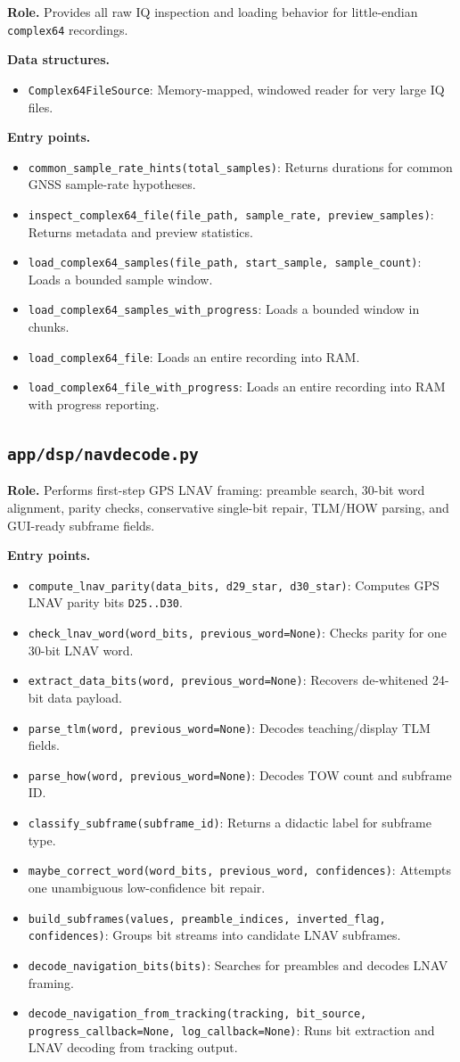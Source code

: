 \documentclass[11pt,a4paper]{article}
\newcommand{\codepath}[1]{\nolinkurl{#1}}
\newcommand{\codeheading}[1]{\texorpdfstring{\codepath{#1}}{#1}}
\newcommand{\codesym}[1]{\nolinkurl{#1}}
\newcommand{\apiitem}[2]{\item \codesym{#1}: #2}
\begin{document}
\textbf{Role.} Provides all raw IQ inspection and loading behavior for little-endian \texttt{complex64} recordings.

\textbf{Data structures.}
\begin{itemize}
  \apiitem{Complex64FileSource}{Memory-mapped, windowed reader for very large IQ files.}
\end{itemize}

\textbf{Entry points.}
\begin{itemize}
  \apiitem{common_sample_rate_hints(total_samples)}{Returns durations for common GNSS sample-rate hypotheses.}
  \apiitem{inspect_complex64_file(file_path, sample_rate, preview_samples)}{Returns metadata and preview statistics.}
  \apiitem{load_complex64_samples(file_path, start_sample, sample_count)}{Loads a bounded sample window.}
  \apiitem{load_complex64_samples_with_progress}{Loads a bounded window in chunks.}
  \apiitem{load_complex64_file}{Loads an entire recording into RAM.}
  \apiitem{load_complex64_file_with_progress}{Loads an entire recording into RAM with progress reporting.}
\end{itemize}

\subsection{\codeheading{app/dsp/navdecode.py}}

\textbf{Role.} Performs first-step GPS LNAV framing: preamble search, 30-bit word alignment, parity checks, conservative single-bit repair, TLM/HOW parsing, and GUI-ready subframe fields.

\textbf{Entry points.}
\begin{itemize}
  \apiitem{compute_lnav_parity(data_bits, d29_star, d30_star)}{Computes GPS LNAV parity bits \texttt{D25..D30}.}
  \apiitem{check_lnav_word(word_bits, previous_word=None)}{Checks parity for one 30-bit LNAV word.}
  \apiitem{extract_data_bits(word, previous_word=None)}{Recovers de-whitened 24-bit data payload.}
  \apiitem{parse_tlm(word, previous_word=None)}{Decodes teaching/display TLM fields.}
  \apiitem{parse_how(word, previous_word=None)}{Decodes TOW count and subframe ID.}
  \apiitem{classify_subframe(subframe_id)}{Returns a didactic label for subframe type.}
  \apiitem{maybe_correct_word(word_bits, previous_word, confidences)}{Attempts one unambiguous low-confidence bit repair.}
  \apiitem{build_subframes(values, preamble_indices, inverted_flag, confidences)}{Groups bit streams into candidate LNAV subframes.}
  \apiitem{decode_navigation_bits(bits)}{Searches for preambles and decodes LNAV framing.}
  \apiitem{decode_navigation_from_tracking(tracking, bit_source, progress_callback=None, log_callback=None)}{Runs bit extraction and LNAV decoding from tracking output.}
\end{itemize}
\end{document}
